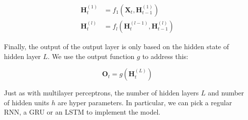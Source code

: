 $$\begin{aligned}
\mathbf{H}_t^{(1)} & = f_1\left(\mathbf{X}_t, \mathbf{H}_{t-1}^{(1)}\right) \\
\mathbf{H}_t^{(l)} & = f_l\left(\mathbf{H}_t^{(l-1)}, \mathbf{H}_{t-1}^{(l)}\right)
\end{aligned}$$

Finally, the output of the output layer is only based on the hidden state of hidden layer $L$. We use the output function $g$ to address this:

$$\mathbf{O}_t = g \left(\mathbf{H}_t^{(L)}\right)$$

Just as with multilayer perceptrons, the number of hidden layers $L$ and number of hidden units $h$ are hyper parameters. In particular, we can pick a regular RNN, a GRU or an LSTM to implement the model.






